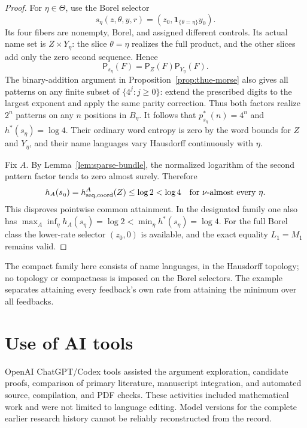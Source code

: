 \documentclass[11pt,reqno]{amsart}
\numberwithin{equation}{section}
\theoremstyle{definition}
\theoremstyle{definition}
\newcommand{\Patt}{\mathsf P}
\newcommand{\one}{\mathbf 1}
\begin{document}
\begin{proof}
For $\eta\in\Theta$, use the Borel selector
\[
 s_\eta(z,\theta,y,r)=(z_0,\one_{\{\theta=\eta\}}y_0).
\]
Its four fibers are nonempty, Borel, and assigned different
controls. Its actual name set is $Z\times Y_\eta$:
the slice $\theta=\eta$ realizes the full product, and the
other slices add only the zero second sequence. Hence
\[
 \Patt_{s_\eta}(F)=\Patt_Z(F)\Patt_{Y_\eta}(F).
\]
The binary-addition argument in Proposition~\ref{prop:thue-morse}
also gives all patterns on any finite subset of
$\{4^j:j\ge0\}$: extend the prescribed digits to the largest
exponent and apply the same parity correction. Thus both factors
realize $2^n$ patterns on any $n$ positions in $B_\eta$.
It follows that $p_{s_\eta}^*(n)=4^n$ and $h^*(s_\eta)=\log4$.
Their ordinary word entropy is zero by the word bounds for
$Z$ and $Y_\eta$, and their name languages vary Hausdorff
continuously with $\eta$.

Fix $A$. By Lemma~\ref{lem:sparse-bundle}, the normalized
logarithm of the second pattern factor tends to zero almost
surely. Therefore
\[
 h_A(s_\eta)=h_{\rm seq,coord}^A(Z)\le\log2<\log4
 \quad\text{for }\nu\text{-almost every }\eta.
\]
This disproves pointwise common attainment. In the designated
family one also has
$\max_A\inf_\eta h_A(s_\eta)=\log2<\min_\eta h^*(s_\eta)=\log4$.
For the full Borel class the lower-rate selector $(z_0,0)$
is available, and the exact equality $L_1=M_1$ remains valid.
\end{proof}

The compact family here consists of name languages, in the Hausdorff
topology; no topology or compactness is imposed on the Borel selectors.
The example separates attaining every feedback's own rate from
attaining the minimum over all feedbacks.


\section*{Use of AI tools}
OpenAI ChatGPT/Codex tools assisted the argument exploration,
candidate proofs, comparison of primary literature, manuscript
integration, and automated source, compilation, and PDF checks.
These activities included mathematical work and were not limited
to language editing. Model versions for the complete earlier
research history cannot be reliably reconstructed from the record.
\end{document}

